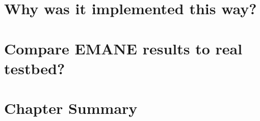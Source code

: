 


\section{Why was it implemented this way?}


\section{Compare EMANE results to real testbed?}

\section{Chapter Summary}

